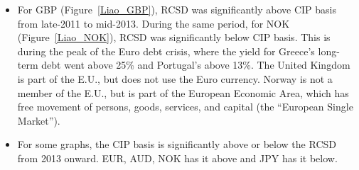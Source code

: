 \begin{itemize}
\item For GBP (Figure~\ref{Liao_GBP}), RCSD was significantly above CIP basis from late-2011 to mid-2013.  During the same period, for NOK (Figure~\ref{Liao_NOK}), RCSD was significantly below CIP basis.  This is during the peak of the Euro debt crisis, where the yield for Greece's long-term debt went above 25\% and Portugal's above 13\%.  The United Kingdom is part of the E.U., but does not use the Euro currency.  Norway is not a member of the E.U., but is part of the European Economic Area, which has free movement of persons, goods, services, and capital (the ``European Single Market'').  

\item For some graphs, the CIP basis is significantly above or below the RCSD from 2013 onward.  EUR, AUD, NOK has it above and JPY has it below.

\end{itemize}








